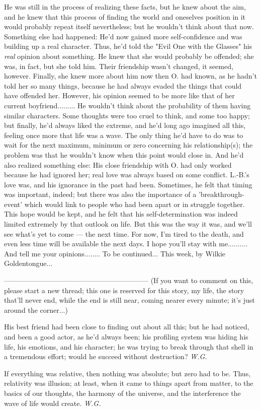 He was still in the process of realizing these facts, but he knew about the aim, and he knew that this process of finding the world and oneselves position in it would probably repeat itself nevertheless; but he wouldn't think about that now. 
Something else had happened: He'd now gained more self-confidence and was building up a real character. Thus, he'd told the "Evil One with the Glasses" his \emph{real} opinion about something. He knew that she would probably be offended; she was, in fact, but she told him. Their friendship wasn't changed, it seemed, however. Finally, she knew more about him now then O. had known, as he hadn't told her so many things, because he had always evaded the things that could have offended her. However, his opinion seemed to be more like that of her current boyfriend.........
He wouldn't think about the probability of them having similar characters. 
Some thoughts were too cruel to think, and some too happy; but finally, he'd always liked the extreme, and he'd long ago imagined all this, feeling once more that life was a wave. The only thing he'd have to do was to wait for the next maximum, minimum or zero concerning his relationship(s); the problem was that he wouldn't know when this point would close in. 
And he'd also realized something else: His close friendship with O. had only worked because he had ignored her; real love was always based on some conflict. 
L.-B.'s love was, and his ignorance in the past had been. 
Sometimes, he felt that timing was important, indeed; but there was also the importance of a 'breakthrough-event' which would link to people who had been apart or in struggle together. 
This hope would be kept, and he felt that his self-determination was indeed limited extremely by that outlook on life. But this was the way it was, and we'll see what's yet to come --- the next time. 
For now, I'm tired to the death, and even less time will be available the next days. 
I hope you'll stay with me..........
And tell me your opinions........
To be continued...
This week, by Wilkie Goldentongue...

--------------------------------------------------------------
(If you want to comment on this, please start a new thread; this one is reserved for this story, my life, the story that'll never end, while the end is still near, coming nearer every minute; it's just around the corner...)

His best friend 
had been close to finding out about all this; 
but he had noticed, 
and been a good actor, 
as he'd always been; 
his profiling system was hiding his life, 
his emotions, 
and his character; 
he was trying to break through that shell 
in a tremendous effort; 
would he succeed without destruction? 
\emph{W.G.}

If everything was relative, 
then nothing was absolute; 
but zero had to be. 
Thus, relativity was illusion; 
at least, when it came to things apart from matter, 
to the basics of our thoughts, 
the harmony of the universe, 
and the interference 
the wave of life 
would create. 
\emph{W.G.}

